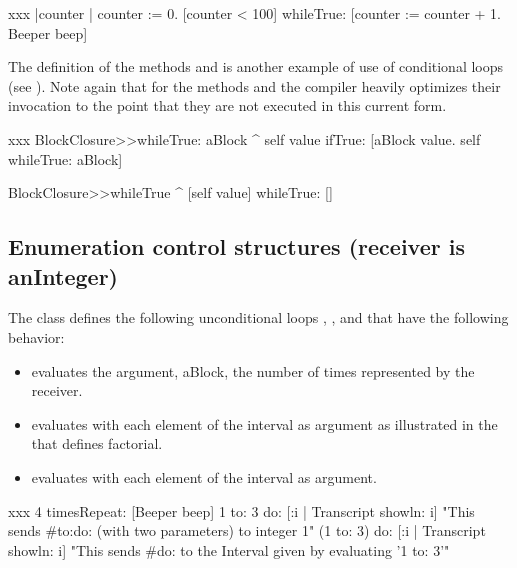 \documentclass[a4paper,10pt,twoside]{book}
\begin{document}
\begin{script}[xxx]{xxx}\label{eg:whileloop}
|counter |
counter := 0.
[counter < 100] whileTrue:
    [counter := counter + 1.
    Beeper beep]
\end{script}

The definition of the methods  and  is another example of use of conditional loops (see ). Note again that for the methods  and  the compiler heavily optimizes their  invocation to the point that they are not executed in this current form.

\begin{method}[xxx]{xxx}\label{mth:while}
BlockClosure>>whileTrue: aBlock
   ^ self value
        ifTrue:
           [aBlock value.
         	  self whileTrue: aBlock]

BlockClosure>>whileTrue
   ^ [self value] whileTrue: []
\end{method}

\subsection{Enumeration control structures (receiver is anInteger)}
\label{sec:loopInteger}
The class  defines the following  unconditional loops ,
 , and   that have the following
behavior:

\begin{itemize}
\item {} evaluates the argument, aBlock, the number of times represented by the receiver.
\item {} evaluates  with each element of the interval  as argument as illustrated in the  that defines factorial.
\item {}	evaluates  with each element of the interval  as argument.
\end{itemize}

\begin{script}[xxx]{xxx}
4 timesRepeat: [Beeper beep]
1 to: 3 do: [:i | Transcript showln: i]
"This sends #to:do: (with two parameters) to integer 1"
(1 to: 3) do:  [:i | Transcript showln: i]
"This sends #do: to the Interval given by evaluating '1 to: 3'"
\end{script}
\end{document}
